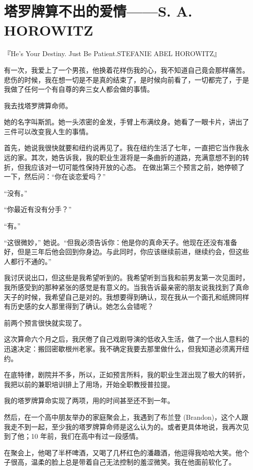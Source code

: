 \section{ 塔罗牌算不出的爱情——S. A. HOROWITZ}
『He’s Your Destiny. Just Be Patient.STEFANIE ABEL HOROWITZ』


有一次，我爱上了一个男孩，他换着花样伤我的心，我不知道自己竟会那样痛苦。悲伤的时候，我在想一切是不是真的结束了，是时候向前看了，一切都完了，于是我做了任何一个有自尊的奔三女人都会做的事情。


我去找塔罗牌算命师。


她的名字叫斯凯。她一头浓密的金发，手臂上布满纹身。她看了一眼卡片，讲出了三件可以改变我人生的事情。


首先，她说我很快就要和纽约说再见了。我在纽约生活了七年，一直把它当作我永远的家。其次，她告诉我，我的职业生涯将是一条曲折的道路，充满意想不到的转折，但我应该对一切可能性保持开放的心态。
在做出第三个预言之前，她停顿了一下，然后问：“你在谈恋爱吗？”


“没有。”


“你最近有没有分手？”


“有。”


“这很微妙，” 她说。“但我必须告诉你：他是你的真命天子。他现在还没有准备好，但是三年后他会回到你身边。与此同时，你应该继续前进，继续约会，但这些人都行不通的。”


我讨厌说出口，但这些是我希望听到的。我希望听到当我和前男友第一次见面时，我所感受到的那种紧张的感觉是有意义的。当我告诉最亲密的朋友说我找到了真命天子的时候，我希望自己是对的。我想要得到确认，现在我从一个面孔和纸牌同样有历史感的女人那里得到了确认。她怎么会错呢？


前两个预言很快就实现了。


这次算命六个月之后，我厌倦了自己戏剧导演的低收入生活，做了一个出人意料的迅速决定：搬回密歇根州老家。我不确定我要去那里做什么，但我知道必须离开纽约。


在底特律，剧院并不多，所以，正如预言所料，我的职业生涯出现了极大的转折，我把以前的兼职培训排上了用场，开始全职教授普拉提。


我的塔罗牌算命实现了两项，用的时间甚至还不到一年。


然后，在一个高中朋友举办的家庭聚会上，我遇到了布兰登 (Brandon)，这个人跟我走不到一起，至少我的塔罗牌算命师是这么认为的。或者更具体地说，我再次见到了他；10 年前，我们在高中有过一段感情。


在聚会上，他喝了半杯啤酒，又喝了几杯红色的潘趣酒，他逗得我哈哈大笑。他个子很高，温柔的脸上总是带着自己无法控制的羞涩微笑。我在他面前软化了。


